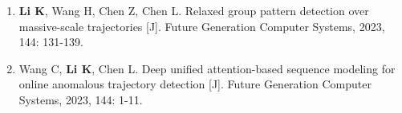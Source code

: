 \begin{enumerate}
        \item \textbf{Li K}, Wang H, Chen Z, Chen L. Relaxed group pattern detection over massive-scale trajectories [J]. Future Generation Computer Systems, 2023, 144: 131-139.

		\item Wang C, \textbf{Li K}, Chen L. Deep unified attention-based sequence modeling for online anomalous trajectory detection [J]. Future Generation Computer Systems, 2023, 144: 1-11.









	\end{enumerate}

	\newpage